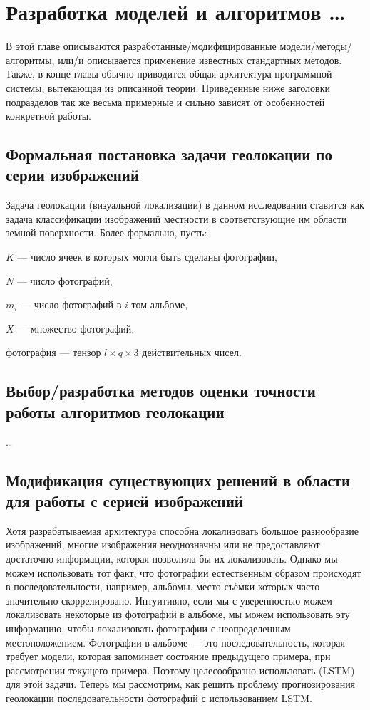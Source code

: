  \chapter{Разработка моделей и алгоритмов \dots}

В этой главе описываются разработанные/модифицированные модели/методы/
алгоритмы, или/и описывается применение известных стандартных методов. Также, 
в конце главы обычно приводится общая архитектура программной системы, 
вытекающая из описанной теории. Приведенные ниже заголовки подразделов так же 
весьма примерные и сильно зависят от особенностей конкретной работы.
\section{Формальная постановка задачи геолокации по серии изображений}

Задача геолокации (визуальной локализации) в данном исследовании ставится как задача классификации изображений местности в соответствующие им области земной поверхности. Более формально, пусть:

\begin{compactitem}
	\item $K$ --- число ячеек в которых могли быть сделаны фотографии,
	\item $N$ --- число фотографий,
	\item $m_i$ --- число фотографий в $i$-том альбоме,
	\item $X$ --- множество фотографий. 
	\item 
\end{compactitem}
фотография --- тензор $ l \times q \times 3$  действительных чисел. 
\section{Выбор/разработка методов оценки точности работы алгоритмов геолокации}

\dots


\section{Модификация существующих решений в области для работы с серией изображений}

Хотя разрабатываемая архитектура способна локализовать большое разнообразие изображений, многие изображения неоднозначны или не предоставляют достаточно информации, которая позволила бы их локализовать.
Однако мы можем использовать тот факт, что фотографии естественным образом происходят в последовательности, например, альбомы, место съёмки которых часто значительно скоррелировано. Интуитивно, если мы с уверенностью можем локализовать
некоторые из фотографий в альбоме, мы можем использовать эту информацию,
чтобы локализовать фотографии с неопределенным местоположением. Фотографии в альбоме --- это последовательность,
которая требует модели, которая запоминает состояние предыдущего примера, 
при рассмотрении текущего примера. Поэтому целесообразно использовать
(LSTM) \cite{hochreiter1997long} для этой задачи.
Теперь мы рассмотрим, как решить проблему прогнозирования
геолокации последовательности фотографий с использованием LSTM.

